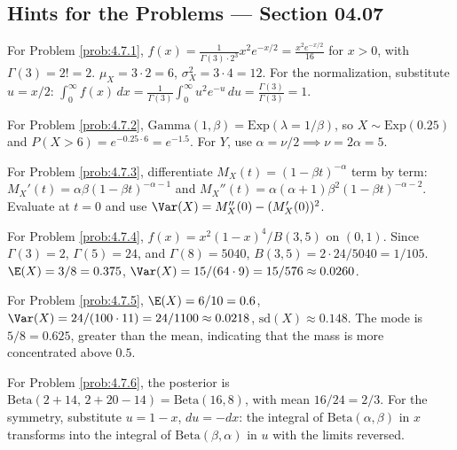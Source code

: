 \subsection*{Hints for the Problems --- Section 04.07}

\begin{sugerencia}
	\label{sug:4.7.1}
	For Problem \ref{prob:4.7.1}, $f(x) = \frac{1}{\Gamma(3)\cdot 2^{3}}x^{2}e^{-x/2} = \frac{x^{2}e^{-x/2}}{16}$ for $x>0$, with $\Gamma(3)=2!=2$. $\mu_X = 3\cdot 2=6$, $\sigma_X^{2}=3\cdot 4=12$. For the normalization, substitute $u=x/2$: $\int_0^\infty f(x)\,dx = \frac{1}{\Gamma(3)}\int_0^\infty u^{2}e^{-u}\,du = \frac{\Gamma(3)}{\Gamma(3)}=1$.
\end{sugerencia}

\begin{sugerencia}
	\label{sug:4.7.2}
	For Problem \ref{prob:4.7.2}, $\text{Gamma}(1,\beta) = \text{Exp}(\lambda=1/\beta)$, so $X \sim \text{Exp}(0.25)$ and $P(X>6)=e^{-0.25\cdot 6}=e^{-1.5}$. For $Y$, use $\alpha=\nu/2 \implies \nu=2\alpha=5$.
\end{sugerencia}

\begin{sugerencia}
	\label{sug:4.7.3}
	For Problem \ref{prob:4.7.3}, differentiate $M_{X}(t)=(1-\beta t)^{-\alpha}$ term by term: $M_X'(t)=\alpha\beta(1-\beta t)^{-\alpha-1}$ and $M_X''(t)=\alpha(\alpha+1)\beta^{2}(1-\beta t)^{-\alpha-2}$. Evaluate at $t=0$ and use $\Var(X)=M_X''(0)-(M_X'(0))^{2}$.
\end{sugerencia}

\begin{sugerencia}
	\label{sug:4.7.4}
	For Problem \ref{prob:4.7.4}, $f(x) = x^{2}(1-x)^{4}/B(3,5)$ on $(0,1)$. Since $\Gamma(3)=2$, $\Gamma(5)=24$, and $\Gamma(8)=5040$, $B(3,5) = 2\cdot 24/5040 = 1/105$. $\E(X)=3/8=0.375$, $\Var(X)=15/(64\cdot 9)=15/576\approx 0.0260$.
\end{sugerencia}

\begin{sugerencia}
	\label{sug:4.7.5}
	For Problem \ref{prob:4.7.5}, $\E(X)=6/10=0.6$, $\Var(X)=24/(100\cdot 11)=24/1100\approx 0.0218$, $\text{sd}(X)\approx 0.148$. The mode is $5/8=0.625$, greater than the mean, indicating that the mass is more concentrated above $0.5$.
\end{sugerencia}

\begin{sugerencia}
	\label{sug:4.7.6}
	For Problem \ref{prob:4.7.6}, the posterior is $\text{Beta}(2+14,\,2+20-14)=\text{Beta}(16,8)$, with mean $16/24=2/3$. For the symmetry, substitute $u=1-x$, $du=-dx$: the integral of $\text{Beta}(\alpha,\beta)$ in $x$ transforms into the integral of $\text{Beta}(\beta,\alpha)$ in $u$ with the limits reversed.
\end{sugerencia}

